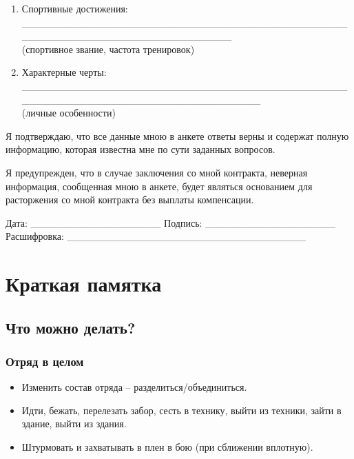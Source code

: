 \documentclass[
]{article}
\begin{document}
\begin{enumerate}
  (место, период прохождения, военная специальность)
\item
  Спортивные достижения:
  \_\_\_\_\_\_\_\_\_\_\_\_\_\_\_\_\_\_\_\_\_\_\_\_\_\_\_\_\_\_\_\_\_\_\_\_\_\_\_\_\_\_\_\_\_\_\_\_\_\_\_\_\_\_\_\_\_\_\_\_\_\_\_\_\_\_\_\_\_\_\_\_\_\_\\
  (спортивное звание, частота тренировок)
\item
  Характерные черты:
  \_\_\_\_\_\_\_\_\_\_\_\_\_\_\_\_\_\_\_\_\_\_\_\_\_\_\_\_\_\_\_\_\_\_\_\_\_\_\_\_\_\_\_\_\_\_\_\_\_\_\_\_\_\_\_\_\_\_\_\_\_\_\_\_\_\_\_\_\_\_\_\_\_\_\_\_\_\_\\
  (личные особенности)
\end{enumerate}

Я подтверждаю, что все данные мною в анкете ответы верны и содержат
полную информацию, которая известна мне по сути заданных вопросов.

Я предупрежден, что в случае заключения со мной контракта, неверная
информация, сообщенная мною в анкете, будет являться основанием для
расторжения со мной контракта без выплаты компенсации.

Дата: \_\_\_\_\_\_\_\_\_\_\_\_\_\_\_\_\_\_ Подпись:
\_\_\_\_\_\_\_\_\_\_\_\_\_\_\_\_\_\_ Расшифровка:
\_\_\_\_\_\_\_\_\_\_\_\_\_\_\_\_\_\_\_\_\_\_\_\_\_\_\_\_\_\_\_\_\_

\section*{Краткая
памятка}\label{ux43aux440ux430ux442ux43aux430ux44f-ux43fux430ux43cux44fux442ux43aux430}

\subsection*{Что можно
делать?}\label{ux447ux442ux43e-ux43cux43eux436ux43dux43e-ux434ux435ux43bux430ux442ux44c}

\subsubsection*{Отряд в
целом}\label{ux43eux442ux440ux44fux434-ux432-ux446ux435ux43bux43eux43c}

\begin{itemize}
\item
  Изменить состав отряда -- разделиться/объединиться.
\item
  Идти, бежать, перелезать забор, сесть в технику, выйти из техники,
  зайти в здание, выйти из здания.
\item
  Штурмовать и захватывать в плен в бою (при сближении вплотную).
\end{itemize}
\end{document}
